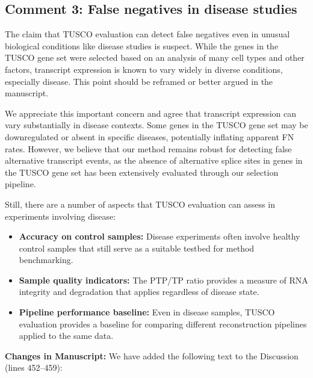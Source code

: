 \documentclass[11pt]{article}
\newcommand{\tuscoGeneSet}{TUSCO gene set}
\newcommand{\tuscoEvaluation}{TUSCO evaluation}
\begin{document}
\subsection{Comment 3: False negatives in disease studies}

\begin{reviewercomment}
The claim that TUSCO evaluation can detect false negatives even in unusual biological conditions like disease studies is suspect. While the genes in the TUSCO gene set were selected based on an analysis of many cell types and other factors, transcript expression is known to vary widely in diverse conditions, especially disease. This point should be reframed or better argued in the manuscript.
\end{reviewercomment}

\begin{responseboxnew}
We appreciate this important concern and agree that transcript expression can vary substantially in disease contexts. Some genes in the \tuscoGeneSet{} may be downregulated or absent in specific diseases, potentially inflating apparent FN rates. However, we believe that our method remains robust for detecting false alternative transcript events, as the absence of alternative splice sites in genes in the \tuscoGeneSet{} has been extensively evaluated through our selection pipeline.
    \vspace{0.3cm}
    
Still, there are a number of aspects that \tuscoEvaluation{} can assess in experiments involving disease:
    \begin{itemize}
      \item \textbf{Accuracy on control samples:} Disease experiments often involve healthy control samples that still serve as a suitable testbed for method benchmarking.

      \item \textbf{Sample quality indicators:} The PTP/TP ratio provides a
        measure of RNA integrity and degradation that applies regardless of
        disease state.

      \item \textbf{Pipeline performance baseline:} Even in disease samples, TUSCO evaluation
        provides a baseline for comparing different reconstruction pipelines applied
        to the same data.
    \end{itemize}

    \vspace{0.3cm}
    \textbf{Changes in Manuscript:} We have added the following text to the Discussion (lines 452--459):


\end{responseboxnew}
\end{document}
